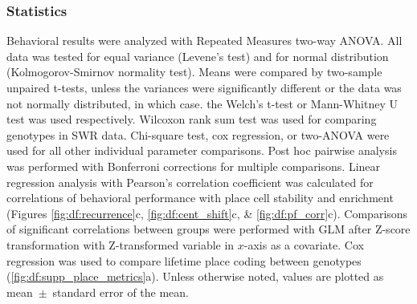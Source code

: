 \subsubsection{Statistics}
Behavioral results were analyzed with Repeated Measures two-way ANOVA. All data was tested for equal variance (Levene's test) and for normal distribution (Kolmogorov-Smirnov normality test). Means were compared by two-sample unpaired t-tests, unless the variances were significantly different or the data was not normally distributed, in which case. the Welch's t-test or Mann-Whitney U test was used respectively. Wilcoxon rank sum test was used for comparing genotypes in SWR data. Chi-square test, cox regression, or two-ANOVA were used for all other individual parameter comparisons. Post hoc pairwise analysis was performed with Bonferroni corrections for multiple comparisons. Linear regression analysis with Pearson's correlation coefficient was calculated for correlations of behavioral performance with place cell stability and enrichment (Figures \ref{fig:df:recurrence}c, \ref{fig:df:cent_shift}c, \& \ref{fig:df:pf_corr}c). Comparisons of significant correlations between groups were performed with GLM after Z-score transformation with Z-transformed variable in $x$-axis as a covariate. Cox regression was used to compare lifetime place coding between genotypes (\autoref{fig:df:supp_place_metrics}a). Unless otherwise noted, values are plotted as mean~$\pm$~standard error of the mean.
